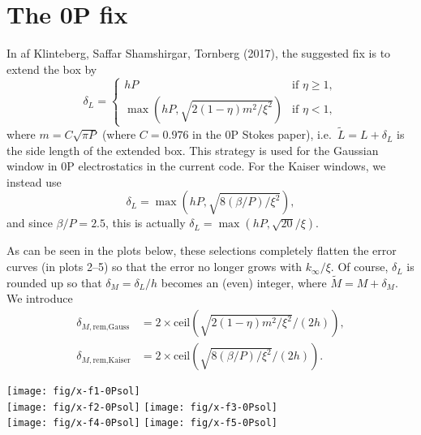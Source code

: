 \documentclass[a4paper,10pt]{article}
\begin{document}
\section{The 0P fix}

In af Klinteberg, Saffar Shamshirgar, Tornberg (2017), the
suggested fix is to extend the box by
\[
  \delta_L = \begin{cases}
    hP & \text{if $\eta \geq 1$}, \\
    \max(hP, \sqrt{2(1-\eta)m^2/\xi^2}) & \text{if $\eta < 1$},
  \end{cases}
\]
where $m = C \sqrt{\pi P}$ (where $C=0.976$ in the 0P Stokes
paper), i.e.\ $\tilde{L} = L + \delta_L$ is the side length of
the extended box. This strategy is used for the Gaussian window
in 0P electrostatics in the current code. For the Kaiser windows,
we instead use
\[
  \delta_L = \max(hP, \sqrt{8 (\beta/P) /\xi^2}),
\]
and since $\beta/P = 2.5$, this is actually $\delta_L = \max(hP,
\sqrt{20}/\xi)$.

As can be seen in the plots below, these selections completely
flatten the error curves (in plots 2--5) so that the error no
longer grows with $k_\infty/\xi$. Of course, $\delta_L$ is
rounded up so that $\delta_M = \delta_L/h$ becomes an (even)
integer, where $\tilde{M} = M + \delta_M$. We introduce
\begin{align*}
  \delta_{M,\text{rem,Gauss}} &= 2 \times
  \text{ceil}(\sqrt{2(1-\eta)m^2/\xi^2}/(2h)), \\
  \delta_{M,\text{rem,Kaiser}} &= 2 \times
  \text{ceil}(\sqrt{8 (\beta/P) /\xi^2}/(2h)).
\end{align*}

{\noindent\centering
\texttt{[image: fig/x-f1-0Psol]}\\%
\texttt{[image: fig/x-f2-0Psol]}%
\texttt{[image: fig/x-f3-0Psol]}\\%
\texttt{[image: fig/x-f4-0Psol]}%
\texttt{[image: fig/x-f5-0Psol]}}
\end{document}
